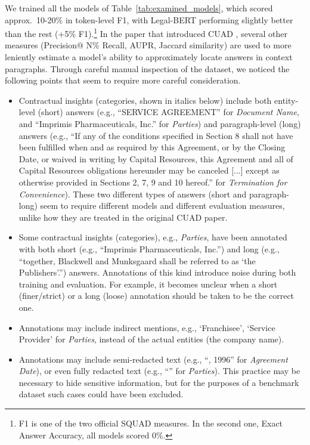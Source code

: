 \documentclass[11pt]{article}
\begin{document}
We trained all the models of Table~\ref{tab:examined_models}, which scored approx.\ 10-20\% in token-level F1, with Legal-BERT performing slightly better than the rest (+5\% F1).\footnote{F1 is one of the two official SQUAD measures. In the second one, Exact Answer Accuracy, all models scored 0\%.}  In the paper that introduced CUAD  \cite{Hendrycks2021CUAD}, several other measures (Precision@ N\% Recall, AUPR, Jaccard similarity) are used to more leniently estimate a  model's ability to approximately locate answers in context paragraphs. Through careful manual inspection of the dataset, we noticed the following points that seem to require more careful consideration.
\begin{itemize}[leftmargin=8pt]
    \item Contractual insights (categories, shown in italics below) include both entity-level (short) answers (e.g., ``SERVICE AGREEMENT'' for \emph{Document Name}, and ``Imprimis Pharmaceuticals, Inc.'' for \emph{Parties}) and paragraph-level (long) answers (e.g., ``If any of the conditions  specified in Section 8 shall not have been  fulfilled when and as required by this  Agreement,  or by the Closing Date,  or waived in writing  by Capital  Resources,  this  Agreement  and all of Capital Resources  obligations hereunder may be canceled [...] except as otherwise  provided in Sections 2, 7, 9 and 10 hereof.'' for \emph{Termination for Convenience}). These two different types of answers (short and paragraph-long) seem to require different models and different evaluation measures, unlike how they are treated in the original CUAD paper.
    
    \item Some contractual insights (categories), e.g., \emph{Parties}, have been annotated with both short (e.g., ``Imprimis Pharmaceuticals, Inc.'') and long (e.g., ``together, Blackwell and Munksgaard shall be referred to as `the Publishers'.'') answers. 
Annotations of this kind introduce noise during both training and evaluation. For example, it becomes unclear when a short (finer/strict) or a long (loose) annotation should be taken to be the correct one. 
    
    \item Annotations may include indirect mentions, e.g., `Franchisee', `Service Provider' for \emph{Parties},  instead of the actual entities (the company name). 


    \item Annotations may include semi-redacted text (e.g., ``\underline{\hspace{1cm}}, 1996'' for \emph{Agreement Date}), or even fully redacted text (e.g., ``\underline{\hspace{2cm}}'' for \emph{Parties}). This practice may be necessary to hide sensitive information, but for the purposes of a benchmark dataset such cases could have been excluded.
\end{itemize}
\end{document}

